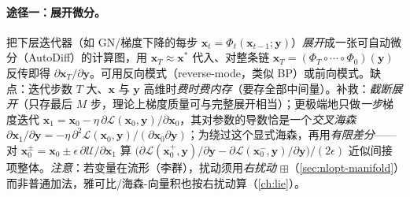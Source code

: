\paragraph{途径一：展开微分。}\cite{carlone2026handbook}
把下层迭代器（如 GN/梯度下降的每步 $\mathbf{x}_t=\Phi_t(\mathbf{x}_{t-1};\mathbf{y})$）\emph{展开}成一张可自动微分（AutoDiff）的计算图，用 $\mathbf{x}_T\approx\mathbf{x}^*$ 代入、对整条链 $\mathbf{x}_T=(\Phi_T\circ\cdots\circ\Phi_0)(\mathbf{y})$ 反传即得 $\partial\mathbf{x}_T/\partial\mathbf{y}$。可用反向模式（reverse-mode，类似 BP）或前向模式。缺点：迭代步数 $T$ 大、$\mathbf{x}$ 与 $\mathbf{y}$ 高维时\emph{费时费内存}（要存全部中间量）。补救：\emph{截断展开}（只存最后 $M$ 步，理论上梯度质量可与完整展开相当）；更极端地只做\emph{一步}梯度迭代 $\mathbf{x}_1=\mathbf{x}_0-\eta\,\partial\mathcal{L}(\mathbf{x}_0,\mathbf{y})/\partial\mathbf{x}_0$，其对参数的导数恰是一个\emph{交叉海森} $\partial\mathbf{x}_1/\partial\mathbf{y}=-\eta\,\partial^2\mathcal{L}(\mathbf{x}_0,\mathbf{y})/(\partial\mathbf{x}_0\partial\mathbf{y})$；为绕过这个显式海森，再用\emph{有限差分}——对 $\mathbf{x}_0^\pm=\mathbf{x}_0\pm\epsilon\,\partial\mathcal{U}/\partial\mathbf{x}_1$ 算 $\big(\partial\mathcal{L}(\mathbf{x}_0^+,\mathbf{y})/\partial\mathbf{y}-\partial\mathcal{L}(\mathbf{x}_0^-,\mathbf{y})/\partial\mathbf{y}\big)/(2\epsilon)$ 近似间接项整体。\emph{注意}：若变量在流形（李群），扰动须用\emph{右扰动} $\boxplus$（\cref{sec:nlopt-manifold}）而非普通加法，雅可比/海森-向量积也按右扰动算（\cref{ch:lie}）。

